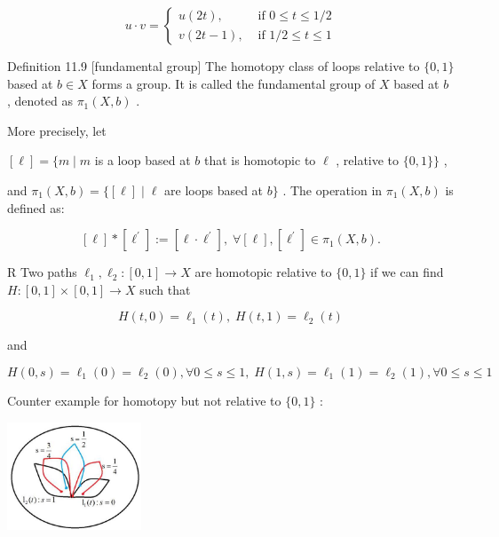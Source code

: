 \[
u \cdot  v = \left\{  \begin{array}{rr} u\left( {2t}\right) , & \text{ if }0 \leq  t \leq  1/2 \\  v\left( {{2t} - 1}\right) , & \text{ if }1/2 \leq  t \leq  1 \end{array}\right.
\]

Definition 11.9 [fundamental group] The homotopy class of loops relative to \(\{ 0,1\}\) based at \(b \in  X\) forms a group. It is called the fundamental group of \(X\) based at \(b\) , denoted as \({\pi }_{1}\left( {X,b}\right)\) .

More precisely, let

\(\left\lbrack  \ell \right\rbrack   = \{ m \mid  m\) is a loop based at \(b\) that is homotopic to \(\ell\) , relative to \(\{ 0,1\} \}\) ,

and \({\pi }_{1}\left( {X,b}\right)  = \{ \left\lbrack  \ell \right\rbrack   \mid  \ell\) are loops based at \(b\}\) . The operation in \({\pi }_{1}\left( {X,b}\right)\) is defined as:

\[
\left\lbrack  \ell \right\rbrack   * \left\lbrack  {\ell }^{\prime }\right\rbrack   \mathrel{\text{ := }} \left\lbrack  {\ell  \cdot  {\ell }^{\prime }}\right\rbrack  ,\;\forall \left\lbrack  \ell \right\rbrack  ,\left\lbrack  {\ell }^{\prime }\right\rbrack   \in  {\pi }_{1}\left( {X,b}\right) .
\]

R Two paths \({\ell }_{1},{\ell }_{2} : \left\lbrack  {0,1}\right\rbrack   \rightarrow  X\) are homotopic relative to \(\{ 0,1\}\) if we can find \(H : \left\lbrack  {0,1}\right\rbrack   \times  \left\lbrack  {0,1}\right\rbrack   \rightarrow  X\) such that

\[
H\left( {t,0}\right)  = {\ell }_{1}\left( t\right) ,\;H\left( {t,1}\right)  = {\ell }_{2}\left( t\right)
\]

and

\[
H\left( {0,s}\right)  = {\ell }_{1}\left( 0\right)  = {\ell }_{2}\left( 0\right) ,\forall 0 \leq  s \leq  1,\;H\left( {1,s}\right)  = {\ell }_{1}\left( 1\right)  = {\ell }_{2}\left( 1\right) ,\forall 0 \leq  s \leq  1
\]

Counter example for homotopy but not relative to \(\{ 0,1\}\) :

\begin{center}
\includegraphics[max width=0.3\textwidth]{images/bo_d2bcsrref24c73avs720_113_744_1658_456_366_0.jpg}
\end{center}
\hspace*{3em} 

